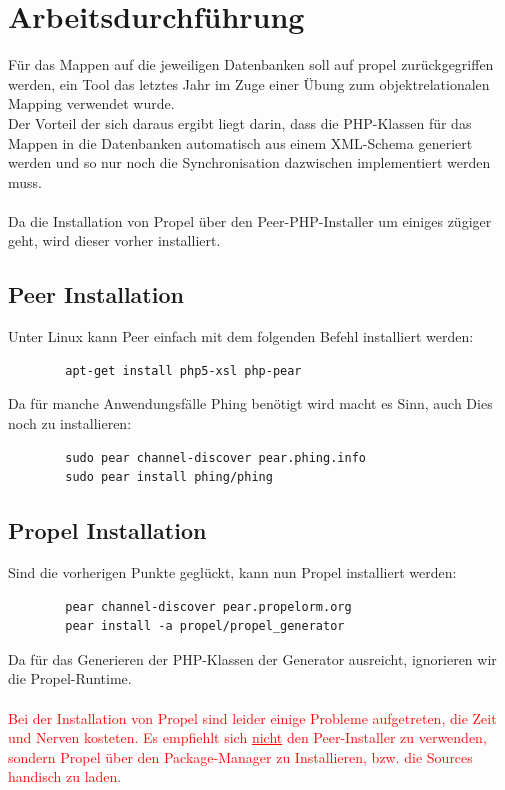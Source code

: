 \documentclass[a4paper]{article}
\begin{document}
	\section{Arbeitsdurchführung}
	Für das Mappen auf die jeweiligen Datenbanken soll auf propel zurückgegriffen werden, ein Tool das letztes Jahr im Zuge einer Übung zum objektrelationalen Mapping verwendet wurde.\\
	Der Vorteil der sich daraus ergibt liegt darin, dass die PHP-Klassen für das Mappen in die Datenbanken automatisch aus einem XML-Schema generiert werden und so nur noch die Synchronisation dazwischen implementiert werden muss.\\
	\\
	Da die Installation von Propel über den Peer-PHP-Installer um einiges zügiger geht, wird dieser vorher installiert.
	
	\subsection{Peer Installation}
	Unter Linux kann Peer einfach mit dem folgenden Befehl installiert werden:
	\begin{lstlisting}
		apt-get install php5-xsl php-pear
	\end{lstlisting}
	Da für manche Anwendungsfälle Phing benötigt wird macht es Sinn, auch Dies noch zu installieren:
	\begin{lstlisting}
		sudo pear channel-discover pear.phing.info
		sudo pear install phing/phing
	\end{lstlisting}
	\subsection{Propel Installation}
	Sind die vorherigen Punkte geglückt, kann nun Propel installiert werden:
	\begin{lstlisting}
		pear channel-discover pear.propelorm.org
		pear install -a propel/propel_generator
	\end{lstlisting}
	Da für das Generieren der PHP-Klassen der Generator ausreicht, ignorieren wir die Propel-Runtime.\\
	\\
	\textcolor{red}{Bei der Installation von Propel sind leider einige Probleme aufgetreten, die Zeit und Nerven kosteten. Es empfiehlt sich \underline{nicht} den Peer-Installer zu verwenden, sondern Propel über den Package-Manager zu Installieren, bzw. die Sources handisch zu laden.}
	
	\newpage
\end{document}
